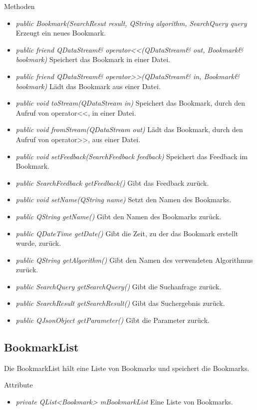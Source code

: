 Methoden
\begin{itemize}
\item \textit{public Bookmark(SearchResut result, QString algorithm, SearchQuery query} Erzeugt ein neues Bookmark.
\item \textit{public friend QDataStream\& operator<<(QDataStream\& out, Bookmark\& bookmark)} Speichert das Bookmark in einer Datei.
\item \textit{public friend QDataStream\& operator>>(QDataStream\& in, Bookmark\& bookmark)} Lädt das Bookmark aus einer Datei.
\item \textit{public void toStream(QDataStream in)} Speichert das Bookmark, durch den Aufruf von operator<<, in einer Datei.
\item \textit{public void fromStream(QDataStream out)} Lädt das Bookmark, durch den Aufruf von operator>>, aus einer Datei.
\item\textit{public void setFeedback(SearchFeedback feedback)} Speichert das Feedback im Bookmark.
\item\textit{public SearchFeedback getFeedback()} Gibt das Feedback zurück.
\item\textit{public void setName(QString name)} Setzt den Namen des Bookmarks.
\item\textit{public QString getName()} Gibt den Namen des Bookmarks zurück.
\item\textit{public QDateTime getDate()} Gibt die Zeit, zu der das Bookmark erstellt wurde, zurück.
\item\textit{public QString getAlgorithm()} Gibt den Namen des verwendeten Algorithmus zurück.
\item\textit{public SearchQuery getSearchQuery()} Gibt die Suchanfrage zurück.
\item\textit{public SearchResult getSearchResult()} Gibt das Suchergebnis zurück.
\item\textit{public QJsonObject getParameter()} Gibt die Parameter zurück.
\end{itemize}

\subsection*{BookmarkList}
Die BookmarkList hält eine Liste von Bookmarks und speichert die Bookmarks.

Attribute
\begin{itemize}
\item\textit{private QList<Bookmark> mBookmarkList} Eine Liste von Bookmarks.
\end{itemize}

